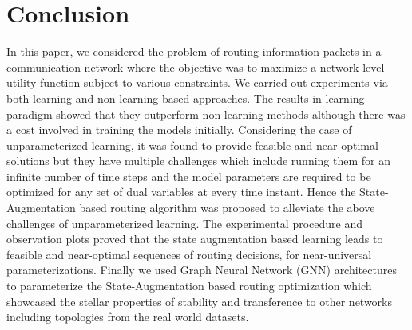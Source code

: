 \documentclass[lettersize,journal]{IEEEtran}
\begin{document}
\section{Conclusion} \label{sec:conclusion}
In this paper, we considered the problem of routing information packets in a communication network where the objective was to maximize a network level utility function subject to various constraints. We carried out experiments via both learning and non-learning based approaches. The results in learning paradigm showed that they outperform non-learning methods although there was a cost involved in training the models initially. Considering the case of unparameterized learning, it was found to provide feasible and near optimal solutions but they have multiple challenges which include running them for an infinite number of time steps and the model parameters are required to be optimized for any set of dual variables at every time instant. Hence the State-Augmentation based routing algorithm was proposed to alleviate the above challenges of unparameterized learning. The experimental procedure and observation plots proved that the state augmentation based learning leads to feasible and near-optimal sequences of routing decisions, for near-universal parameterizations. Finally we used Graph Neural Network (GNN) architectures to parameterize the State-Augmentation based routing optimization which showcased the stellar properties of stability and transference to other networks including topologies from the real world datasets.



\end{document}

